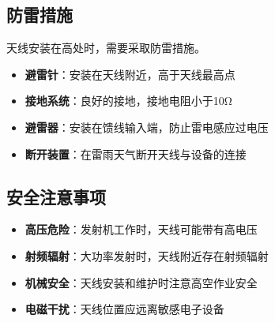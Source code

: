 \subsection{防雷措施}
\label{sec:lightning_protection}

天线安装在高处时，需要采取防雷措施。

\begin{itemize}
    \item \textbf{避雷针}：安装在天线附近，高于天线最高点
    \item \textbf{接地系统}：良好的接地，接地电阻小于10Ω
    \item \textbf{避雷器}：安装在馈线输入端，防止雷电感应过电压
    \item \textbf{断开装置}：在雷雨天气断开天线与设备的连接
\end{itemize}

\subsection{安全注意事项}
\label{sec:safety_precautions}

\begin{itemize}
    \item \textbf{高压危险}：发射机工作时，天线可能带有高电压
    \item \textbf{射频辐射}：大功率发射时，天线附近存在射频辐射
    \item \textbf{机械安全}：天线安装和维护时注意高空作业安全
    \item \textbf{电磁干扰}：天线位置应远离敏感电子设备
\end{itemize}


